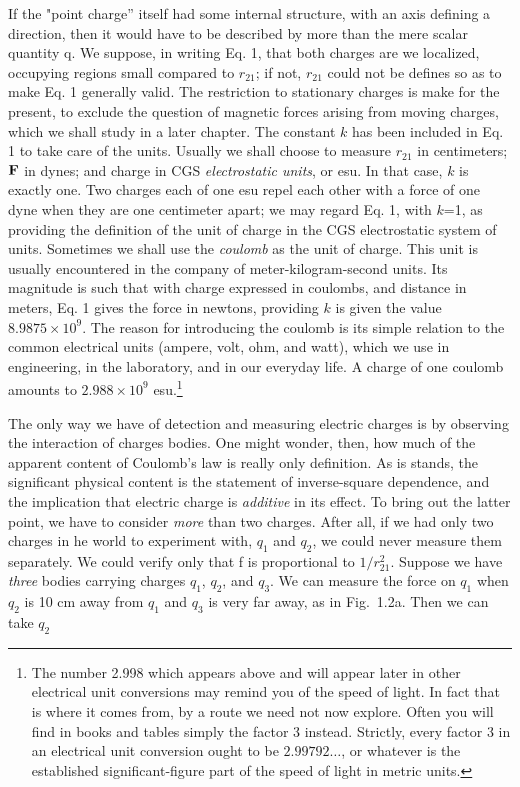 If the "point charge'' itself had some internal structure, with an
axis defining a direction, then it would have to be described by more
than the mere scalar quantity q. We suppose, in writing Eq. 1, that
both charges are we localized, occupying regions small compared to
$r_{21}$; if not, $r_{21}$ could not be defines so as to make Eq. 1
generally valid. The restriction to stationary charges is make for
the present, to exclude the question of magnetic forces arising from
moving charges, which we shall study in a later chapter. The constant
$k$ has been included in Eq. 1 to take care of the units. Usually we
shall choose to measure $r_{21}$ in centimeters;  $\mathbf{F}$ in dynes; and
charge in CGS \emph{electrostatic units}, or esu.
In that case, $k$
is exactly one. Two charges each of one esu repel each other with a
force of one dyne when they are one centimeter apart; we may regard
Eq. 1, with $k$=1, as providing the definition of the unit of charge
in the CGS electrostatic system of units. Sometimes we shall use the
\emph{coulomb} as the unit of charge. This unit is usually
encountered in the company of meter-kilogram-second units. Its
magnitude is such that with charge expressed in coulombs, and
distance in meters, Eq. 1 gives the force in newtons, providing $k$
is given the value $8.9875\times 10^{9}$. The reason for introducing
the coulomb is its simple relation to the common electrical units
(ampere, volt, ohm, and watt), which we use in engineering, in the
laboratory, and in our everyday life. A charge of one coulomb amounts
to $2.988\times 10^{9}$ esu.\footnote {The number 2.998 which
appears above and will appear later in other electrical unit
conversions may remind you of the speed of light. In fact that is
where it comes from, by a route we need not now explore. Often you
will find in books and tables simply the factor 3 instead. Strictly,
every factor 3 in an electrical unit conversion ought to be
$2.99792\ldots$, or whatever is the established significant-figure part of
the speed of light in metric units.}

The only way we have of detection and measuring electric charges is
by observing the interaction of charges bodies. One might wonder,
then, how much of the apparent content of Coulomb's law is really
only definition. As is stands, the significant physical content is
the statement of inverse-square dependence, and the implication that
electric charge is \emph{additive} in its effect. To bring out the
latter point, we have to consider \emph{more} than two charges. After
all, if we had only two charges in he world to experiment with, $q_1$
and $q_2$, we could never measure them separately. We could verify
only that f is proportional to $1/r_{{21}}^2$. Suppose we have
\emph{three} bodies carrying charges $q_1$, $q_2$, and $q_3$. We can
measure the force on $q_1$ when $q_2$ is 10 cm away from $q_1$ and
$q_3$ is very far away, as in Fig.~1.2a. Then we can take $q_2$

